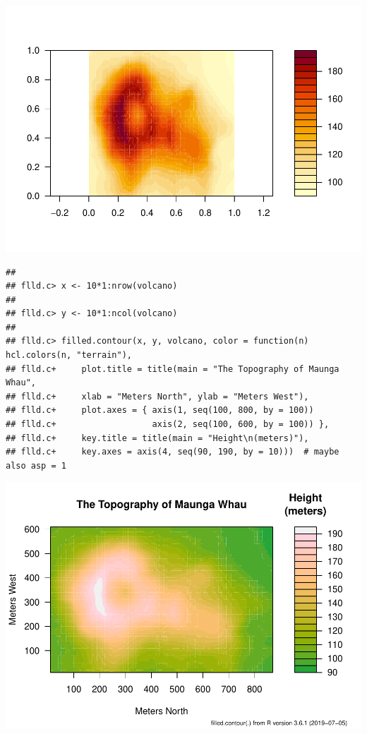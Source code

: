 \documentclass[
]{book}
\begin{document}
\includegraphics{TudodoR_files/figure-latex/unnamed-chunk-145-4.pdf}

\begin{verbatim}
## 
## flld.c> x <- 10*1:nrow(volcano)
## 
## flld.c> y <- 10*1:ncol(volcano)
## 
## flld.c> filled.contour(x, y, volcano, color = function(n) hcl.colors(n, "terrain"),
## flld.c+     plot.title = title(main = "The Topography of Maunga Whau",
## flld.c+     xlab = "Meters North", ylab = "Meters West"),
## flld.c+     plot.axes = { axis(1, seq(100, 800, by = 100))
## flld.c+                   axis(2, seq(100, 600, by = 100)) },
## flld.c+     key.title = title(main = "Height\n(meters)"),
## flld.c+     key.axes = axis(4, seq(90, 190, by = 10)))  # maybe also asp = 1
\end{verbatim}

\includegraphics{TudodoR_files/figure-latex/unnamed-chunk-145-5.pdf}
\end{document}
